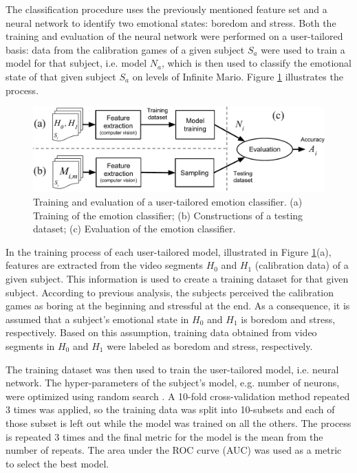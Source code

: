 The classification procedure uses the previously mentioned feature set and a neural network to identify two emotional states: boredom and stress. Both the training and evaluation of the neural network were performed on a user-tailored basis: data from the calibration games of a given subject $S_a$ were used to train a model for that subject, i.e. model $N_a$, which is then used to classify the emotional state of that given subject $S_a$ on levels of Infinite Mario. Figure \ref{fig:experiment2-training-evaluation} illustrates the process.

\begin{figure}[ht]
    \centering
    \includegraphics[width=\textwidth]{Content/figures/experiment2-training-evaluation}
    \caption{Training and evaluation of a user-tailored emotion classifier. (a) Training of the emotion classifier; (b) Constructions of a testing dataset; (c) Evaluation of the emotion classifier.}
    \label{fig:experiment2-training-evaluation}
\end{figure}

In the training process of each user-tailored model, illustrated in Figure \ref{fig:experiment2-training-evaluation}(a), features are extracted from the video segments $H_0$ and $H_1$ (calibration data) of a given subject. This information is used to create a training dataset for that given subject. According to previous analysis, the subjects perceived the calibration games as boring at the beginning and stressful at the end. As a consequence, it is assumed that a subject's emotional state in $H_0$ and $H_1$ is boredom and stress, respectively. Based on this assumption, training data obtained from video segments in $H_0$ and $H_1$ were labeled as boredom and stress, respectively.

The training dataset was then used to train the user-tailored model, i.e. neural network. The hyper-parameters of the subject's model, e.g. number of neurons, were optimized using random search \parencite{bergstra2012random}. A 10-fold cross-validation method repeated 3 times was applied, so the training data was split into 10-subsets and each of those subset is left out while the model was trained on all the others. The process is repeated 3 times and the final metric for the model is the mean from the number of repeats. The area under the ROC curve (AUC) was used as a metric to select the best model.

